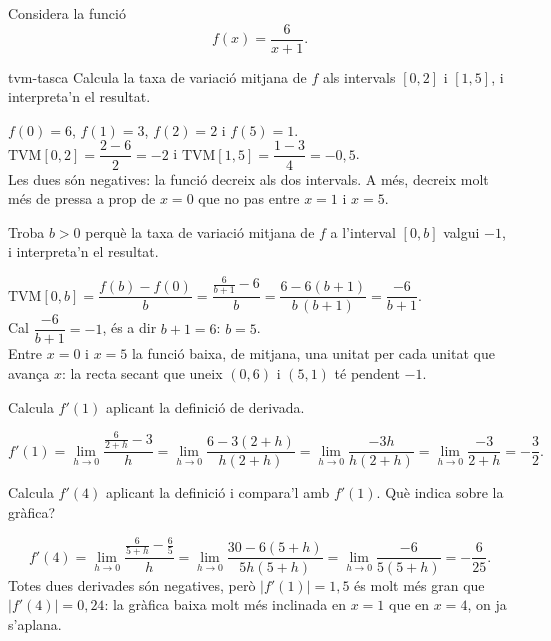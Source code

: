 Considera la funció
\[
f(x)=\frac{6}{x+1} .
\]

\begin{apartats}

\begin{tria}{tvm-tasca}
Calcula la taxa de variació mitjana de $f$ als intervals $[0,2]$ i $[1,5]$, i interpreta'n el
resultat.

\begin{solucio}
$f(0)=6$, $f(1)=3$, $f(2)=2$ i $f(5)=1$.\\
$\mathrm{TVM}[0,2]=\dfrac{2-6}{2}=-2$ \quad i \quad $\mathrm{TVM}[1,5]=\dfrac{1-3}{4}=-0{,}5$.\\
Les dues són negatives: la funció decreix als dos intervals. A més, decreix molt més de pressa
a prop de $x=0$ que no pas entre $x=1$ i $x=5$.
\end{solucio}

Troba $b>0$ perquè la taxa de variació mitjana de $f$ a l'interval $[0,b]$ valgui $-1$, i
interpreta'n el resultat.

\begin{solucio}
$\mathrm{TVM}[0,b]=\dfrac{f(b)-f(0)}{b}=\dfrac{\frac{6}{b+1}-6}{b}=\dfrac{6-6(b+1)}{b\,(b+1)}=\dfrac{-6}{b+1}$.\\
Cal $\dfrac{-6}{b+1}=-1$, és a dir $b+1=6$: $\boxed{b=5}$.\\
Entre $x=0$ i $x=5$ la funció baixa, de mitjana, una unitat per cada unitat que avança $x$: la
recta secant que uneix $(0,6)$ i $(5,1)$ té pendent $-1$.
\end{solucio}
\end{tria}

Calcula $f'(1)$ aplicant la definició de derivada.

\begin{solucio}
\[
f'(1)=\lim_{h\to0}\frac{\frac{6}{2+h}-3}{h}
=\lim_{h\to0}\frac{6-3(2+h)}{h(2+h)}
=\lim_{h\to0}\frac{-3h}{h(2+h)}
=\lim_{h\to0}\frac{-3}{2+h}=-\frac32 .
\]
\end{solucio}

\begin{nomesllarg}
Calcula $f'(4)$ aplicant la definició i compara'l amb $f'(1)$. Què indica sobre la gràfica?

\begin{solucio}
\[
f'(4)=\lim_{h\to0}\frac{\frac{6}{5+h}-\frac65}{h}
=\lim_{h\to0}\frac{30-6(5+h)}{5h(5+h)}
=\lim_{h\to0}\frac{-6}{5(5+h)}=-\frac{6}{25} .
\]
Totes dues derivades són negatives, però $|f'(1)|=1{,}5$ és molt més gran que
$|f'(4)|=0{,}24$: la gràfica baixa molt més inclinada en $x=1$ que en $x=4$, on ja s'aplana.
\end{solucio}
\end{nomesllarg}

\end{apartats}
